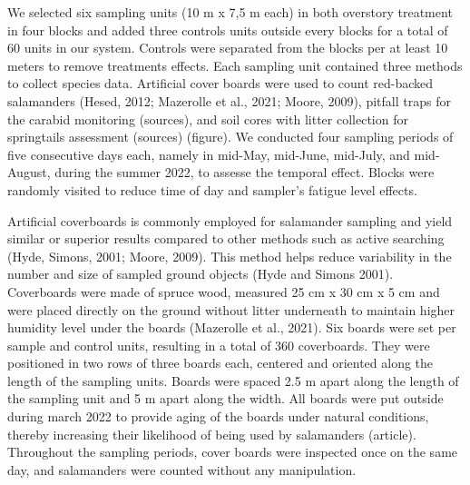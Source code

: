 We selected six sampling units (10 m x 7,5 m each) in both overstory treatment in four blocks and added three controls units outside every blocks for a total of 60 units in our system. 
Controls were separated from the blocks per at least 10 meters to remove treatments effects.
Each sampling unit contained three methods to collect species data. 
Artificial cover boards were used to count red-backed salamanders (Hesed, 2012; Mazerolle et al., 2021; Moore, 2009), 
pitfall traps for the carabid monitoring (sources), and soil cores with litter collection for springtails assessment (sources) (figure).
We conducted four sampling periods of five consecutive days each, namely in mid-May, mid-June, mid-July, and mid-August, during the summer 2022, to assesse the temporal effect. 
Blocks were randomly visited to reduce time of day and sampler's fatigue level effects.

Artificial coverboards is commonly employed for salamander sampling and yield similar or superior results compared to other methods such as active searching (Hyde, Simons, 2001; Moore, 2009). 
This method helps reduce variability in the number and size of sampled ground objects (Hyde and Simons 2001). 
Coverboards were made of spruce wood, measured 25 cm x 30 cm x 5 cm and were placed directly on the ground without litter underneath to maintain higher humidity level under the boards (Mazerolle et al., 2021). 
Six boards were set per sample and control units, resulting in a total of 360 coverboards.
They were positioned in two rows of three boards each, centered and oriented along the length of the sampling units.
Boards were spaced 2.5 m apart along the length of the sampling unit and 5 m apart along the width.
All boards were put outside during march 2022 to provide aging of the boards under natural conditions, thereby increasing their likelihood of being used by salamanders (article).
Throughout the sampling periods, cover boards were inspected once on the same day, and salamanders were counted without any manipulation.

